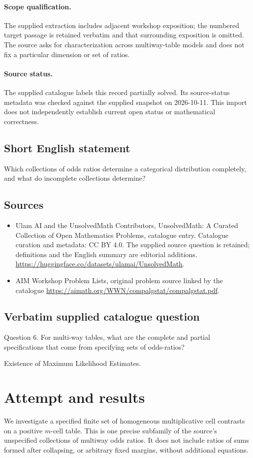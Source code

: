 \documentclass[11pt]{article}
\begin{document}
\paragraph{Scope qualification.}
The supplied extraction includes adjacent workshop exposition; the numbered target passage is retained verbatim and that surrounding exposition is omitted. The source asks for characterization across multiway-table models and does not fix a particular dimension or set of ratios.
\paragraph{Source status.}
The supplied catalogue labels this record partially solved. Its source-status metadata was checked against the supplied snapshot on 2026-10-11. This import does not independently establish current open status or mathematical correctness.
\subsection{Short English statement}
Which collections of odds ratios determine a categorical distribution completely, and what do incomplete collections determine?
\subsection{Sources}
\begin{itemize}
\item[S1] Ulam AI and the UnsolvedMath Contributors, UnsolvedMath: A Curated Collection of Open Mathematics Problems, catalogue entry. Catalogue curation and metadata: CC BY 4.0. The supplied source question is retained; definitions and the English summary are editorial additions.
\url{https://huggingface.co/datasets/ulamai/UnsolvedMath}.
\item[S2] AIM Workshop Problem Lists, original problem source linked by the catalogue
\url{https://aimath.org/WWN/compalgstat/compalgstat.pdf}.
\end{itemize}
\subsection{Verbatim supplied catalogue question}
Question 6. For multi-way tables, what are the complete and partial specifications that come from specifying sets of odds-ratios?

Existence of Maximum Likelihood Estimates.

\section{Attempt and results}
We investigate a specified finite set of homogeneous multiplicative
cell contrasts on a positive $m$-cell table. This is one precise subfamily
of the source's unspecified collections of multiway odds ratios. It does
not include ratios of sums formed after collapsing, or arbitrary fixed
margins, without additional equations.
\end{document}
